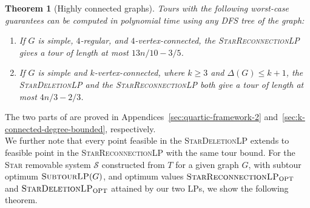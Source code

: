 \documentclass[11pt]{amsart}
\newcommand{\1}{\mathbbm{1}}
\newcommand{\SubtourLP}{\textsc{SubtourLP}}
\newcommand{\LPone}{\textsc{StarDeletionLP}}
\newcommand{\LPtwo}{\textsc{StarReconnectionLP}}
\newtheorem{theorem}{Theorem}[section]
\begin{document}
\begin{samepage}
\begin{theorem}[Highly connected graphs]
\label{thm:intro-connected}
Tours with the following worst-case guarantees can be computed in polynomial time {using any DFS tree of the graph:} 
\begin{enumerate}[label=(\roman*),leftmargin=*]
\item If $G$ is simple, $4$-regular, and $4$-vertex-connected,
the \LPtwo{} gives a tour of length at most $13n/10-3/5$.
\item If $G$ is simple and $k$-vertex-connected, where $k\ge3$
and $\Delta(G)\le k+1$, the \LPone{} and the \LPtwo{}
both give a tour of length at most $4n/3-2/3$.
\end{enumerate}
\end{theorem}
\end{samepage}
The two parts of  are proved in Appendices~\ref{sec:quartic-framework-2}
and~\ref{sec:k-connected-degree-bounded}, respectively. \\

We further note that every point feasible in the \LPone{} extends to feasible point in the \LPtwo{} with the same tour bound. For the \textsc{Star} removable system $\mathcal S$ constructed from $T$ for a given graph $G$, with subtour optimum ${\text{\SubtourLP}(G)}$, and optimum values $\text{\LPtwo}_{\mathrm{OPT}}$ and $\text{\LPone}_{\mathrm{OPT}}$ attained by our two LPs,  
we show the following theorem.  
\end{document}
